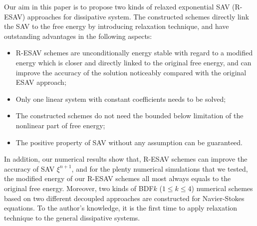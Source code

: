 \documentclass[final,review,onefignum,onetabnum]{siamart190516}
\theoremstyle{plain}
\begin{document}
\begin{comment}
\end{itemize} 
In the definition of above SAV, two kind of schemes based on exponential SAV proposed in \cite{liu2020exponential, liu2021highly} has some additional advantages. 
No matter which type of the definition of the SAV, it can be easily shown that the above scheme is unconditionally energy stable with a modified energy $\tilde E(\phi^n)=\frac{1}{2}(\mathcal{L} \phi^n, \phi^n)+\left(H^{-1}\left(r\right)\right)^{n+1}-\left(H^{-1}\left(r\right)\right)^{n}$. 
However, as described in \cite{zhang2022generalized}, $r^{n+1}$ is not linked to   
$H\left(\int_{\Omega} F(\phi^{n}) \mathrm{d} \boldsymbol{x}\right)$ directly and may take very different values, thus the ratio $\frac{r^{n+1}}{H\left(\int_{\Omega} F(\phi^{n}) \mathrm{d} \boldsymbol{x}\right)} $ converge to a value away from $1$. 
Hence, it may lead to inaccurate solutions if the time step is not sufficiently small. 
\end{comment}

Our aim in this paper is to propose two kinds of relaxed exponential SAV (R-ESAV) approaches for dissipative system. The constructed schemes directly link the SAV to the free energy by introducing relaxation technique, and have outstanding advantages in the
following aspects:
\begin{itemize}
\item R-ESAV schemes are unconditionally energy stable with regard to a modified energy which is closer and directly linked to the original free energy, and can improve the accuracy of the solution noticeably compared with the original ESAV approach;
\item Only one linear system with constant coefficients needs to be solved;
\item The constructed schemes do not need the bounded below limitation of the nonlinear part of free energy;
\item The positive property of SAV without any assumption can be guaranteed.
\end{itemize}
In addition, our numerical results show that, R-ESAV schemes can improve the accuracy of SAV $\xi^{n+1}$, and for the plenty numerical simulations that we tested, the modified energy of our R-ESAV schemes all most always equals to the original free energy. 
Moreover, two kinds of BDF$k$ ($1 \leq k \leq 4$) numerical schemes based on two different decoupled approaches are constructed for Navier-Stokes equations. 
To the author's knowledge, it is the first time to apply relaxation technique to the general dissipative systems.
\end{document}
